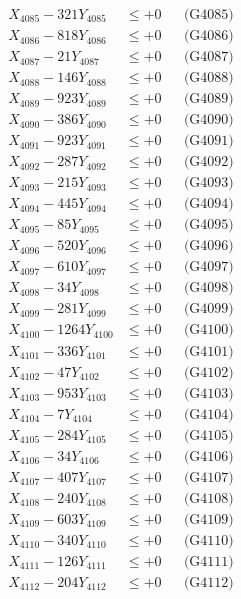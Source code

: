 \documentclass[a4paper,10pt]{article}
\begin{document}
{\begin{align}
X_{4085} - 321Y_{4085} &\leq +0 && \text{(G4085)} \\
X_{4086} - 818Y_{4086} &\leq +0 && \text{(G4086)} \\
X_{4087} - 21Y_{4087} &\leq +0 && \text{(G4087)} \\
X_{4088} - 146Y_{4088} &\leq +0 && \text{(G4088)} \\
X_{4089} - 923Y_{4089} &\leq +0 && \text{(G4089)} \\
X_{4090} - 386Y_{4090} &\leq +0 && \text{(G4090)} \\
\allowbreak
X_{4091} - 923Y_{4091} &\leq +0 && \text{(G4091)} \\
X_{4092} - 287Y_{4092} &\leq +0 && \text{(G4092)} \\
X_{4093} - 215Y_{4093} &\leq +0 && \text{(G4093)} \\
X_{4094} - 445Y_{4094} &\leq +0 && \text{(G4094)} \\
X_{4095} - 85Y_{4095} &\leq +0 && \text{(G4095)} \\
X_{4096} - 520Y_{4096} &\leq +0 && \text{(G4096)} \\
X_{4097} - 610Y_{4097} &\leq +0 && \text{(G4097)} \\
X_{4098} - 34Y_{4098} &\leq +0 && \text{(G4098)} \\
X_{4099} - 281Y_{4099} &\leq +0 && \text{(G4099)} \\
X_{4100} - 1264Y_{4100} &\leq +0 && \text{(G4100)} \\
\allowbreak
X_{4101} - 336Y_{4101} &\leq +0 && \text{(G4101)} \\
X_{4102} - 47Y_{4102} &\leq +0 && \text{(G4102)} \\
X_{4103} - 953Y_{4103} &\leq +0 && \text{(G4103)} \\
X_{4104} - 7Y_{4104} &\leq +0 && \text{(G4104)} \\
X_{4105} - 284Y_{4105} &\leq +0 && \text{(G4105)} \\
X_{4106} - 34Y_{4106} &\leq +0 && \text{(G4106)} \\
X_{4107} - 407Y_{4107} &\leq +0 && \text{(G4107)} \\
X_{4108} - 240Y_{4108} &\leq +0 && \text{(G4108)} \\
X_{4109} - 603Y_{4109} &\leq +0 && \text{(G4109)} \\
X_{4110} - 340Y_{4110} &\leq +0 && \text{(G4110)} \\
\allowbreak
X_{4111} - 126Y_{4111} &\leq +0 && \text{(G4111)} \\
X_{4112} - 204Y_{4112} &\leq +0 && \text{(G4112)} \\

\end{align}}
\end{document}
